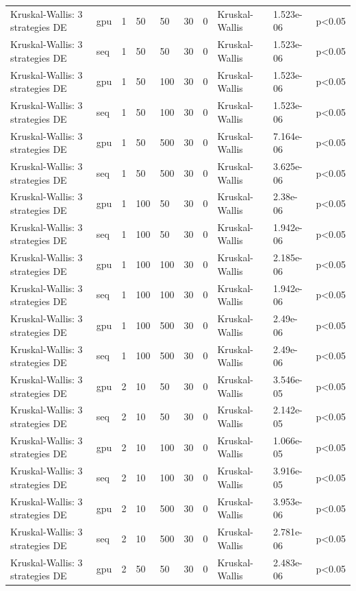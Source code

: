 \begin{table}[t]
\begin{tabular}{llllllllll}
Kruskal-Wallis: 3 strategies DE & gpu & 1 & 50 & 50 & 30 & 0 & Kruskal-Wallis & 1.523e-06 & p<0.05 \\
Kruskal-Wallis: 3 strategies DE & seq & 1 & 50 & 50 & 30 & 0 & Kruskal-Wallis & 1.523e-06 & p<0.05 \\
Kruskal-Wallis: 3 strategies DE & gpu & 1 & 50 & 100 & 30 & 0 & Kruskal-Wallis & 1.523e-06 & p<0.05 \\
Kruskal-Wallis: 3 strategies DE & seq & 1 & 50 & 100 & 30 & 0 & Kruskal-Wallis & 1.523e-06 & p<0.05 \\
Kruskal-Wallis: 3 strategies DE & gpu & 1 & 50 & 500 & 30 & 0 & Kruskal-Wallis & 7.164e-06 & p<0.05 \\
Kruskal-Wallis: 3 strategies DE & seq & 1 & 50 & 500 & 30 & 0 & Kruskal-Wallis & 3.625e-06 & p<0.05 \\
Kruskal-Wallis: 3 strategies DE & gpu & 1 & 100 & 50 & 30 & 0 & Kruskal-Wallis & 2.38e-06 & p<0.05 \\
Kruskal-Wallis: 3 strategies DE & seq & 1 & 100 & 50 & 30 & 0 & Kruskal-Wallis & 1.942e-06 & p<0.05 \\
Kruskal-Wallis: 3 strategies DE & gpu & 1 & 100 & 100 & 30 & 0 & Kruskal-Wallis & 2.185e-06 & p<0.05 \\
Kruskal-Wallis: 3 strategies DE & seq & 1 & 100 & 100 & 30 & 0 & Kruskal-Wallis & 1.942e-06 & p<0.05 \\
Kruskal-Wallis: 3 strategies DE & gpu & 1 & 100 & 500 & 30 & 0 & Kruskal-Wallis & 2.49e-06 & p<0.05 \\
Kruskal-Wallis: 3 strategies DE & seq & 1 & 100 & 500 & 30 & 0 & Kruskal-Wallis & 2.49e-06 & p<0.05 \\
Kruskal-Wallis: 3 strategies DE & gpu & 2 & 10 & 50 & 30 & 0 & Kruskal-Wallis & 3.546e-05 & p<0.05 \\
Kruskal-Wallis: 3 strategies DE & seq & 2 & 10 & 50 & 30 & 0 & Kruskal-Wallis & 2.142e-05 & p<0.05 \\
Kruskal-Wallis: 3 strategies DE & gpu & 2 & 10 & 100 & 30 & 0 & Kruskal-Wallis & 1.066e-05 & p<0.05 \\
Kruskal-Wallis: 3 strategies DE & seq & 2 & 10 & 100 & 30 & 0 & Kruskal-Wallis & 3.916e-05 & p<0.05 \\
Kruskal-Wallis: 3 strategies DE & gpu & 2 & 10 & 500 & 30 & 0 & Kruskal-Wallis & 3.953e-06 & p<0.05 \\
Kruskal-Wallis: 3 strategies DE & seq & 2 & 10 & 500 & 30 & 0 & Kruskal-Wallis & 2.781e-06 & p<0.05 \\
Kruskal-Wallis: 3 strategies DE & gpu & 2 & 50 & 50 & 30 & 0 & Kruskal-Wallis & 2.483e-06 & p<0.05 \\

\end{tabular}
\end{table}
